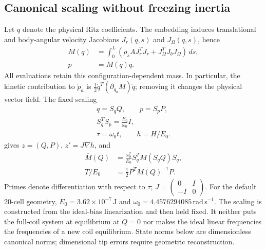 \subsection{Canonical scaling without freezing inertia}
Let $q$ denote the physical Ritz coefficients. The embedding induces translational and body-angular velocity Jacobians $J_r(q,s)$ and $J_\Omega(q,s)$, hence
\begin{equation}
\begin{aligned}
 M(q)&=\int_0^L\left(\rho_s A J_r^TJ_r+
 J_\Omega^TJ_bJ_\Omega\right)\,ds,\\
 p&=M(q)\dot q.
\end{aligned}
 \label{eq:geometric-mass}
\end{equation}
All evaluations retain this configuration-dependent mass. In particular, the kinetic contribution to $\dot p_a$ is
$\tfrac12\dot q^T(\partial_{q_a}M)\dot q$; removing it changes the physical vector field.
The fixed scaling
\begin{equation}
\begin{gathered}
 q=S_qQ,\qquad p=S_pP,\\
 S_q^TS_p=\frac{E_0}{\omega_0}I,\\
 \tau=\omega_0t,\qquad h=H/E_0.
\end{gathered}
 \label{eq:canonical-scaling}
\end{equation}
gives $z=(Q,P)$, $z'=J\nabla h$, and
\begin{equation}
\begin{aligned}
 \overline M(Q)&=\frac{\omega_0^2}{E_0}S_q^TM(S_qQ)S_q,\\
 T/E_0&=\tfrac12P^T\overline M(Q)^{-1}P.
\end{aligned}
 \label{eq:scaled-mass}
\end{equation}
Primes denote differentiation with respect to $\tau$; $J=\left(\begin{smallmatrix}0&I\\-I&0\end{smallmatrix}\right)$.
For the default 20-cell geometry, $E_0=3.62\times10^{-7}$\,J and $\omega_0=4.4576294085$\,rad\,s$^{-1}$. The scaling is constructed from the ideal-bias linearization and then held fixed. It neither puts the full-coil system at equilibrium at $Q=0$ nor makes the ideal linear frequencies the frequencies of a new coil equilibrium. State norms below are dimensionless canonical norms; dimensional tip errors require geometric reconstruction.


